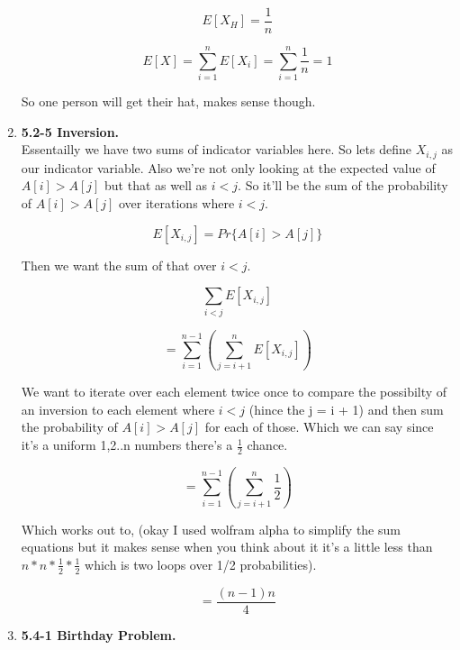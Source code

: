 \documentclass{article}
\begin{document}
\begin{enumerate}
        \[E[X_H] = \frac{1}{n}\]

        \[E[X] = \sum_{i=1}^{n} E[X_i] = \sum_{i=1}^{n} \frac{1}{n} = 1\]

        So one person will get their hat, makes sense though. 

        \item \textbf{5.2-5 Inversion.} \\
        
        Essentailly we have two sums of indicator variables here. So lets define $X_{i,j}$ as our indicator variable. Also we're not only looking at the expected value of $A[i] > A[j]$ but that as well as $i < j$. 
        So it'll be the sum of the probability of $A[i] > A[j]$ over iterations where $i < j$.

        \[E[X_{i,j}] = Pr\{A[i] > A[j]\}\]

        Then we want the sum of that over $i < j$.

        \[\sum_{i < j} E[X_{i,j}]\]

        \[= \sum_{i=1}^{n-1}(\sum_{j=i+1}^n E[X_{i,j}])\]

        We want to iterate over each element twice once to compare the possibilty of an inversion to each element where $i < j$ (hince the j = i + 1) and then sum the probability of $A[i] > A[j]$ for each of those. Which we can say since it's a uniform 1,2..n numbers there's a $\frac{1}{2}$ chance.

        \[= \sum_{i=1}^{n-1}(\sum_{j=i+1}^n \frac{1}{2})\]

        Which works out to, (okay I used wolfram alpha to simplify the sum equations but it makes sense when you think about it it's a little less than $n * n * \frac{1}{2} * \frac{1}{2}$ which is two loops over 1/2 probabilities).

        \[= \frac{(n-1)n}{4}\]

        \item \textbf{5.4-1 Birthday Problem.} \\


  \end{enumerate}
\end{document}
